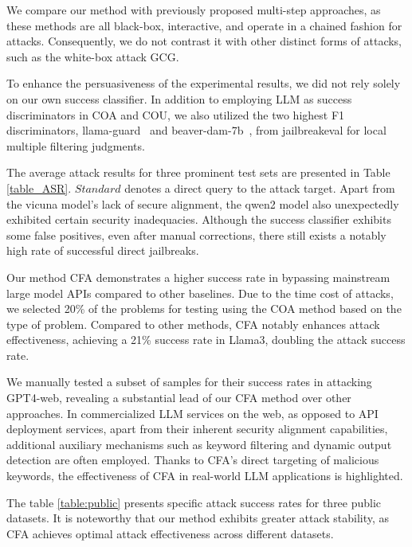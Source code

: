  We compare our method with previously proposed multi-step approaches, as these methods are all black-box, interactive, and operate in a chained fashion for attacks. Consequently, we do not contrast it with other distinct forms of attacks, such as the white-box attack GCG. 

To enhance the persuasiveness of the experimental results, we did not rely solely on our own success classifier. In addition to employing LLM as success discriminators in COA and COU, we also utilized the two highest F1 discriminators, llama-guard~\cite{meta_llama_LlamaGuard_7b} and beaver-dam-7b~\cite{beavertails}, from jailbreakeval\cite{ran2024jailbreakeval}  for local multiple filtering judgments.

The average attack results for three prominent test sets are presented in Table \ref{table_ASR}. $Standard$ denotes a direct query to the attack target. Apart from the vicuna model’s lack of secure alignment, the qwen2 model also unexpectedly exhibited certain security inadequacies. Although the success classifier exhibits some false positives, even after manual corrections, there still exists a notably high rate of successful direct jailbreaks. 

Our method CFA demonstrates a higher success rate in bypassing mainstream large model APIs compared to other baselines. Due to the time cost of attacks, we selected 20\% of the problems for testing using the COA method based on the type of problem. Compared to other methods, CFA notably enhances attack effectiveness, achieving a 21\% success rate in Llama3, doubling the attack success rate.

We manually tested a subset of samples for their success rates in attacking GPT4-web, revealing a substantial lead of our CFA method over other approaches. In commercialized LLM services on the web, as opposed to API deployment services, apart from their inherent security alignment capabilities, additional auxiliary mechanisms such as keyword filtering and dynamic output detection are often employed. Thanks to CFA’s direct targeting of malicious keywords, the effectiveness of CFA in real-world LLM applications is highlighted.

 The table \ref{table:public} presents specific attack success rates for three public datasets. It is noteworthy that our method exhibits greater attack stability, as CFA achieves optimal attack effectiveness across different datasets.

